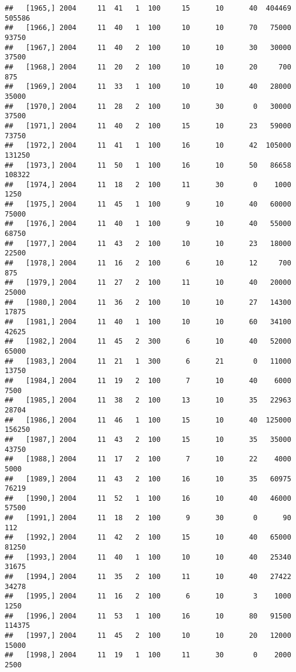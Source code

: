 \documentclass{article}\usepackage[]{graphicx}\usepackage[]{color}
\makeatletter
\newenvironment{kframe}{%
 \def\at@end@of@kframe{}%
 \ifinner\ifhmode%
  \def\at@end@of@kframe{\end{minipage}}%
  \begin{minipage}{\columnwidth}%
 \fi\fi%
 \def\FrameCommand##1{\hskip\@totalleftmargin \hskip-\fboxsep
 \colorbox{shadecolor}{##1}\hskip-\fboxsep
     \hskip-\linewidth \hskip-\@totalleftmargin \hskip\columnwidth}%
 \MakeFramed {\advance\hsize-\width
   \@totalleftmargin\z@ \linewidth\hsize
   \@setminipage}}%
 {\par\unskip\endMakeFramed%
 \at@end@of@kframe}
\newenvironment{knitrout}{}{} %
\makeatother
\begin{document}
\begin{knitrout}
\begin{kframe}
\begin{verbatim}
##   [1965,] 2004     11  41   1  100     15      10      40  404469  505586
##   [1966,] 2004     11  40   1  100     10      10      70   75000   93750
##   [1967,] 2004     11  40   2  100     10      10      30   30000   37500
##   [1968,] 2004     11  20   2  100     10      10      20     700     875
##   [1969,] 2004     11  33   1  100     10      10      40   28000   35000
##   [1970,] 2004     11  28   2  100     10      30       0   30000   37500
##   [1971,] 2004     11  40   2  100     15      10      23   59000   73750
##   [1972,] 2004     11  41   1  100     16      10      42  105000  131250
##   [1973,] 2004     11  50   1  100     16      10      50   86658  108322
##   [1974,] 2004     11  18   2  100     11      30       0    1000    1250
##   [1975,] 2004     11  45   1  100      9      10      40   60000   75000
##   [1976,] 2004     11  40   1  100      9      10      40   55000   68750
##   [1977,] 2004     11  43   2  100     10      10      23   18000   22500
##   [1978,] 2004     11  16   2  100      6      10      12     700     875
##   [1979,] 2004     11  27   2  100     11      10      40   20000   25000
##   [1980,] 2004     11  36   2  100     10      10      27   14300   17875
##   [1981,] 2004     11  40   1  100     10      10      60   34100   42625
##   [1982,] 2004     11  45   2  300      6      10      40   52000   65000
##   [1983,] 2004     11  21   1  300      6      21       0   11000   13750
##   [1984,] 2004     11  19   2  100      7      10      40    6000    7500
##   [1985,] 2004     11  38   2  100     13      10      35   22963   28704
##   [1986,] 2004     11  46   1  100     15      10      40  125000  156250
##   [1987,] 2004     11  43   2  100     15      10      35   35000   43750
##   [1988,] 2004     11  17   2  100      7      10      22    4000    5000
##   [1989,] 2004     11  43   2  100     16      10      35   60975   76219
##   [1990,] 2004     11  52   1  100     16      10      40   46000   57500
##   [1991,] 2004     11  18   2  100      9      30       0      90     112
##   [1992,] 2004     11  42   2  100     15      10      40   65000   81250
##   [1993,] 2004     11  40   1  100     10      10      40   25340   31675
##   [1994,] 2004     11  35   2  100     11      10      40   27422   34278
##   [1995,] 2004     11  16   2  100      6      10       3    1000    1250
##   [1996,] 2004     11  53   1  100     16      10      80   91500  114375
##   [1997,] 2004     11  45   2  100     10      10      20   12000   15000
##   [1998,] 2004     11  19   1  100     11      30       0    2000    2500

\end{verbatim}
\end{kframe}
\end{knitrout}
\end{document}
